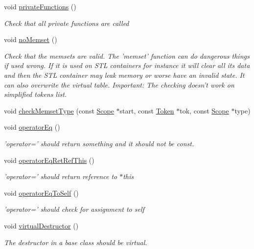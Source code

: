 \begin{DoxyCompactItemize}
void \hyperlink{class_check_class_a78c7f5909941ff780990df74023043a2}{private\-Functions} ()
\begin{DoxyCompactList}\small\item\em Check that all private functions are called \end{DoxyCompactList}\item 
void \hyperlink{class_check_class_ae4884fcd027e1156b0fd371fc7d45af3}{no\-Memset} ()
\begin{DoxyCompactList}\small\item\em Check that the memsets are valid. The 'memset' function can do dangerous things if used wrong. If it is used on S\-T\-L containers for instance it will clear all its data and then the S\-T\-L container may leak memory or worse have an invalid state. It can also overwrite the virtual table. Important\-: The checking doesn't work on simplified tokens list. \end{DoxyCompactList}\item 
void \hyperlink{class_check_class_a10e3db032aae1d74b59d8997b1245e2e}{check\-Memset\-Type} (const \hyperlink{class_scope}{Scope} $\ast$start, const \hyperlink{class_token}{Token} $\ast$tok, const \hyperlink{class_scope}{Scope} $\ast$type)
\item 
void \hyperlink{class_check_class_af51a4a8c640f1e47abc1b045d9f9d80f}{operator\-Eq} ()
\begin{DoxyCompactList}\small\item\em 'operator=' should return something and it should not be const. \end{DoxyCompactList}\item 
void \hyperlink{class_check_class_a315210271a3d40f4f66430fcd75c5c3e}{operator\-Eq\-Ret\-Ref\-This} ()
\begin{DoxyCompactList}\small\item\em 'operator=' should return reference to $\ast$this \end{DoxyCompactList}\item 
void \hyperlink{class_check_class_a68dc55866ec785bbb096fe2bb29c9577}{operator\-Eq\-To\-Self} ()
\begin{DoxyCompactList}\small\item\em 'operator=' should check for assignment to self \end{DoxyCompactList}\item 
void \hyperlink{class_check_class_ad454609fecb5df60ae0cfebe4f035480}{virtual\-Destructor} ()
\begin{DoxyCompactList}\small\item\em The destructor in a base class should be virtual. \end{DoxyCompactList}\item 

\end{DoxyCompactItemize}

